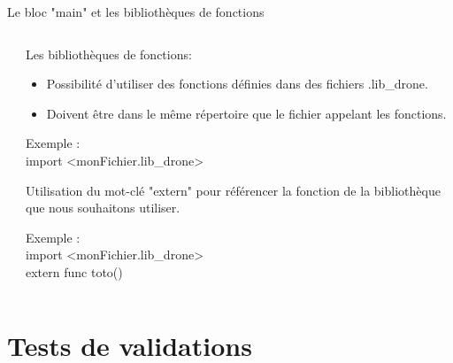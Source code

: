 \documentclass{bredelebeamer}
\begin{document}
\begin{frame}{Le bloc "main" et les bibliothèques de fonctions}
\begin{columns}
\begin{column}{0.5\textwidth}
\begin{tabbing}
\end{tabbing}	
\end{column}
\begin{column}{0.5\textwidth}
Les bibliothèques de fonctions:\\
\begin{itemize}
\item Possibilité d'utiliser des fonctions définies dans des fichiers .lib\_drone.
\item Doivent être dans le même répertoire que le fichier appelant les fonctions.
\end{itemize}\pause
\begin{tabbing}
Exemple :\=\\
            \>\color{Framarouge}import <\color{black}monFichier.lib\_drone\color{Framarouge}>\pause
\end{tabbing}		
\vspace{10px}
Utilisation du mot-clé "\color{Framarouge}extern\color{black}" pour référencer la fonction de la bibliothèque que nous souhaitons utiliser.
\begin{tabbing}
Exemple :\=\\
            \>\color{Framarouge}import <\color{black}monFichier.lib\_drone\color{Framarouge}>\\
	    \>\color{Framarouge}extern func \color{black} toto()
\end{tabbing}

\end{column}
\end{columns}

\end{frame}

\section{Tests de validations}
\end{document}
